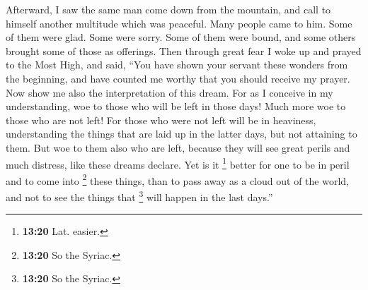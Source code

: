  Afterward, I saw the same man come down from the
mountain, and call to himself another multitude which was peaceful.
 Many people came to him. Some of them were glad. Some
were sorry. Some of them were bound, and some others brought some of
those as offerings. Then through great fear I woke up and prayed to the
Most High, and said,  ``You have shown your servant these
wonders from the beginning, and have counted me worthy that you should
receive my prayer.  Now show me also the interpretation
of this dream.  For as I conceive in my understanding,
woe to those who will be left in those days! Much more woe to those who
are not left!  For those who were not left will be in
heaviness,  understanding the things that are laid up in
the latter days, but not attaining to them.  But woe to
them also who are left, because they will see great perils and much
distress, like these dreams declare.  Yet is it
\footnote{\textbf{13:20} Lat. easier.} better for one to be in peril and
to come into \footnote{\textbf{13:20} So the Syriac.} these things, than
to pass away as a cloud out of the world, and not to see the things that
\footnote{\textbf{13:20} So the Syriac.} will happen in the last days.''

